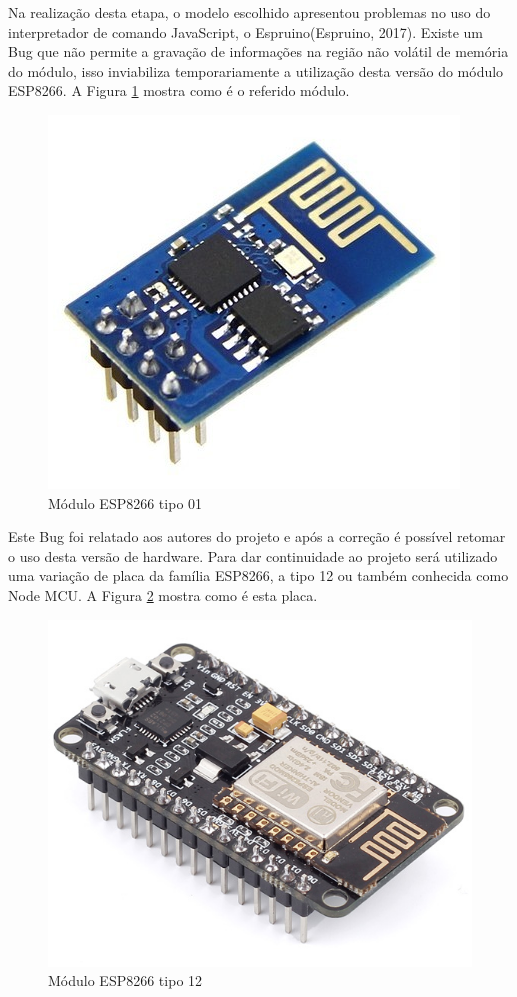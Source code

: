 Na realização desta etapa, o modelo escolhido apresentou problemas no uso do interpretador de comando JavaScript, o Espruino(Espruino, 2017). Existe um Bug que não permite a gravação de informações na região não volátil de memória do módulo, isso inviabiliza temporariamente a utilização desta versão do módulo ESP8266. A Figura \ref{ma-preeview} mostra como é o referido módulo.

\begin{figure}[H]
\caption{\label{ma-preeview} Módulo ESP8266 tipo 01}
\includegraphics[scale=0.25]{img/esp8266-01.png}
\end{figure}

Este Bug foi relatado aos autores do projeto e após a correção é possível retomar o uso desta versão de hardware. Para dar continuidade ao projeto será utilizado uma variação de placa da família ESP8266, a tipo 12 ou também conhecida como Node MCU. A Figura \ref{ma-novo-preeview} mostra como é esta placa.

\begin{figure}[H]
\caption{\label{ma-novo-preeview} Módulo ESP8266 tipo 12}
\includegraphics[scale=0.25]{img/esp8266-12.png}
\end{figure}

